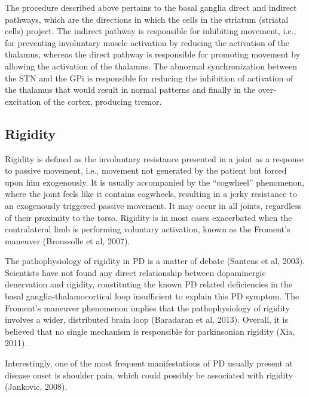The procedure described above pertains to the basal ganglia direct and indirect pathways, which are the directions in which the cells in the striatum (striatal cells) project. The indirect pathway is responsible for inhibiting movement, i.e., for preventing involuntary muscle activation by reducing the activation of the thalamus, whereas the direct pathway is responsible for promoting movement by allowing the activation of the thalamus. The abnormal synchronization between the \gls{STN} and the \gls{GPi} is responsible for reducing the inhibition of activation of the thalamus that would result in normal patterns and finally in the over-excitation of the cortex, producing tremor. 



\subsection{Rigidity}
\label{subsec:rigidity}
Rigidity is defined as the involuntary resistance presented in a joint as a response to passive movement, i.e., movement not generated by the patient but forced upon him exogenously. It is usually accompanied by the ``cogwheel'' phenomenon, where the joint feels like it contains cogwheels, resulting in a jerky resistance to an exogenously triggered passive movement. It may occur in all joints, regardless of their proximity to the torso. Rigidity is in most cases exacerbated when the contralateral limb is performing voluntary activation, known as the Froment's maneuver (Broussolle et al, 2007).

The pathophysiology of rigidity in \gls{PD} is a matter of debate (Santens et al, 2003). Scientists have not found any direct relationship between dopaminergic denervation and rigidity, constituting the known \gls{PD} related deficiencies in the basal ganglia-thalamocortical loop insufficient to explain this \gls{PD} symptom. The Froment's maneuver phenomenon implies that the pathophysiology of rigidity involves a wider, distributed brain loop (Baradaran et al, 2013). Overall, it is believed that no single mechanism is responsible for parkinsonian rigidity (Xia, 2011).

Interestingly, one of the most frequent manifestations of \gls{PD} usually present at disease onset is shoulder pain, which could possibly be associated with rigidity (Jankovic, 2008).


